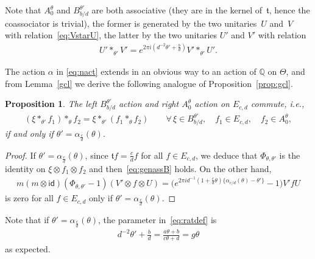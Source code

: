 \documentclass[10pt,a4paper]{amsart}
\numberwithin{equation}{section}
\newtheorem{prop}[thm]{Proposition}
\theoremstyle{definition}
\newcommand{\Q}{\mathbb{Q}}
\newcommand{\id}{\mathsf{id}}
\newcommand{\mf}{\mathfrak}
\newcommand{\gc}{\mf{t}}
\begin{document}
Note that $A_0^\theta$ and $B_{b/d}^{\theta'}$ are both associative (they are in the kernel of~$\gc$, hence the coassociator is trivial), the former is generated by the two unitaries~$U$ and~$V$ with relation~\eqref{eq:VstarU}, the latter by the two unitaries $U'$ and $V'$ with relation
\begin{gather}\label{eq:ratdef}
U'\ast_{\theta'}V'=e^{2\pi i(d^{-2}\theta'+\frac{b}{d})}V'\ast_{\theta'}U' .
\end{gather}

The action $\alpha$ in \eqref{eq:nact} extends in an obvious way to an action of $\Q$ on $\Theta$, and from Lemma~\ref{gcl} we derive the following analogue of Proposition~\ref{prop:gcl}.

\begin{prop}
The left $B_{b/d}^{\theta'}$ action and right $A_0^\theta$ action
on $E_{c,d}$ commute, i.e.,
\begin{gather}\label{eq:genassB}
(\xi\ast_{\theta'}f_1)\ast_\theta f_2=
\xi\ast_{\theta'}(f_1\ast_\theta f_2)
\qquad \forall\,\xi\in B_{b/d}^{\theta'},\quad f_1\in E_{c,d},\quad f_2\in A_0^\theta ,
\end{gather}
if and only if $\theta'=\alpha_{\frac{c}{d}}(\theta)$.
\end{prop}

\begin{proof}
If $\theta'=\alpha_{\frac{c}{d}}(\theta)$,
since $\gc f=\frac{c}{d}f$ for all $f\in E_{c,d}$, we deduce that $\Phi_{\theta,\theta'}$ is the identity on $\xi\otimes f_1\otimes f_2$ and then~\eqref{eq:genassB} holds. On the other hand,
\begin{gather*}
m(m\otimes\id)(\Phi_{\theta,\theta'}-1)(V'\otimes f\otimes U)
=\big(e^{2\pi id^{-1}(1+\frac{c}{d}\theta)
\{\alpha_{c/d}(\theta)-\theta'\}}-1\big)V'fU
\end{gather*}
is zero for all $f\in E_{c,d}$ only if $\theta'=\alpha_{\frac{c}{d}}(\theta)$.
\end{proof}

Note that if $\theta'=\alpha_{\frac{c}{d}}(\theta)$, the parameter in~\eqref{eq:ratdef} is
\begin{gather*}
d^{-2}\theta'+\frac{b}{d}=\frac{a\theta+b}{c\theta+d}=g\theta
\end{gather*}
as expected.
\end{document}
